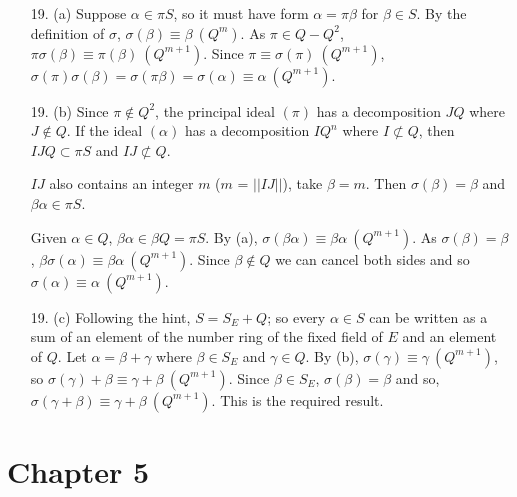 \documentclass{article}
\newcommand{\modequiv}[3]{#1 \equiv #2\ (#3)}
\begin{document}
\begin{enumerate}
\item[19. (a)] Suppose $\alpha \in \pi S$, so it must have form $\alpha = \pi \beta$ for $\beta \in S$.  By the definition of $\sigma$, $\modequiv{\sigma(\beta)}{\beta}{Q^{m}}$.  As $\pi \in Q - Q^{2}$, $\modequiv{\pi\sigma(\beta)}{\pi(\beta)}{Q^{m+1}}$.  Since $\modequiv{\pi}{\sigma(\pi)}{Q^{m+1}}$, $\modequiv{\sigma(\pi)\sigma(\beta) = \sigma(\pi\beta) = \sigma(\alpha)}{\alpha}{Q^{m+1}}$.

\item[19. (b)] Since $\pi \not\in Q^2$, the principal ideal $(\pi)$ has a decomposition $JQ$ where $J \not \in Q$.  If the ideal $(\alpha)$ has a decomposition $IQ^{n}$ where $I \not\subset Q$, then $IJQ \subset \pi S$ and $IJ \not\subset Q$.

$IJ$ also contains an integer $m$ ($m$ = $||IJ||$), take $\beta = m$.  Then $\sigma(\beta) = \beta$ and $\beta \alpha \in \pi S$.

Given $\alpha \in Q$, $\beta \alpha \in \beta Q = \pi S$.  By (a), $\modequiv{\sigma(\beta \alpha)}{\beta \alpha}{Q^{m + 1}}$.  As $\sigma(\beta) = \beta$, $\modequiv{\beta\sigma(\alpha)}{\beta \alpha}{Q^{m+1}}$.  Since $\beta \not\in Q$ we can cancel both sides and so $\modequiv{\sigma(\alpha)}{\alpha}{Q^{m+1}}$.

\item[19. (c)] Following the hint, $S = S_{E} + Q$; so every $\alpha \in S$ can be written as a sum of an element of the number ring of the fixed field of $E$ and an element of $Q$.  Let $\alpha = \beta + \gamma$ where $\beta \in S_{E}$ and $\gamma \in Q$.  By (b), $\modequiv{\sigma(\gamma)}{\gamma}{Q^{m+1}}$, so $\modequiv{\sigma(\gamma) + \beta}{\gamma + \beta}{Q^{m+1}}$.  Since $\beta \in S_{E}$, $\sigma(\beta) = \beta$ and so, $\modequiv{\sigma(\gamma + \beta)}{\gamma + \beta}{Q^{m+1}}$.  This is the required result.

\end{enumerate}

\section*{Chapter 5}
\end{document}
